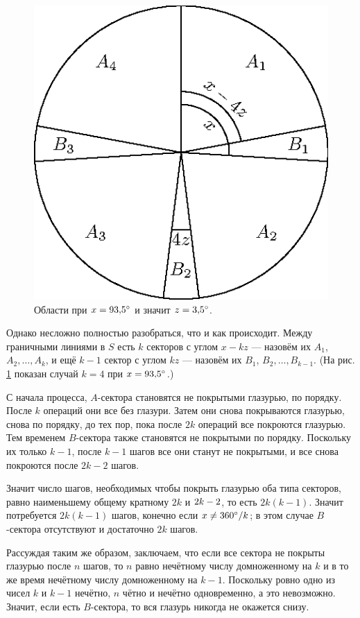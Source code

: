 \begin{figure}[hbt!]
\vskip-0mm
\centering
\includegraphics{mppics/pic-10}
\vskip-0mm
\caption{Области при $x = 93{,}5\degree$ и значит $z = 3{,}5\degree$.}
\label{pic:tort3}
\end{figure}

Однако несложно полностью разобраться, что и как происходит.
Между граничными линиями в $S$ есть $k$ секторов с углом $x - kz$ --- назовём их $A_1$, $A_2, \dots , A_k$, и ещё $k - 1$ сектор с углом $kz$ --- назовём их $B_1$, $B_2, \dots , B_{k-1}$.
(На рис. \ref{pic:tort3} показан случай $k = 4$ при $x = 93{,}5\degree$.)

С начала процесса, $A$-сектора становятся не покрытыми глазурью, по порядку.
После $k$ операций они все без глазури.
Затем они снова покрываются глазурью, снова по порядку, до тех пор, пока после $2k$ операций все покроются глазурью.
Тем временем $B$-сектора также становятся не покрытыми по порядку.
Поскольку их только $k - 1$, после $k - 1$ шагов все они станут не покрытыми, и все снова покроются после $2k - 2$ шагов.

Значит число шагов, необходимых чтобы покрыть глазурью оба типа секторов, равно наименьшему общему кратному $2k$ и $2k \z- 2$, то есть $2k(k - 1)$.
Значит потребуется $2k(k - 1)$ шагов, конечно если $x \z\ne 360\degree/k$;
в этом случае $B$-сектора отсутствуют и достаточно $2k$ шагов.

Рассуждая таким же образом, заключаем, что если все сектора не покрыты глазурью после $n$ шагов,
то $n$ равно нечётному числу домноженному на $k$
и в то же время нечётному числу домноженному на $k - 1$.
Поскольку ровно одно из чисел $k$ и $k - 1$ нечётно, $n$ чётно и нечётно одновременно,
а это невозможно.
Значит, если есть $B$-сектора, то вся глазурь никогда не окажется снизу.

